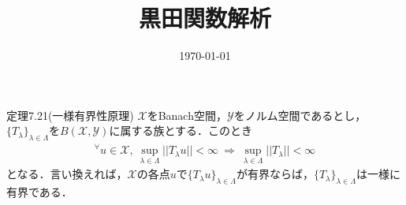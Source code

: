\documentclass[dvipdfmx]{jsarticle}
\title{黒田関数解析}
\author{\empty}
\date{\today}
\begin{document}
%
\begin{itembox}[l]{定理7.21(一様有界性原理)}
$\mathcal{X}$をBanach空間，$\mathcal{Y}$をノルム空間であるとし，$\{T_\lambda\}_{\lambda\in\Lambda}$を$B(\mathcal{X},\mathcal{Y})$に属する族とする．このとき
\begin{align*}
^\forall u\in\mathcal{X},{\ }\sup_{\lambda\in\Lambda}{||T_\lambda u||}<\infty {\ }\Longrightarrow{\ } \sup_{\lambda\in\Lambda}{||T_\lambda||}<\infty
\end{align*}
となる．言い換えれば，$\mathcal{X}$の各点$u$で$\{T_\lambda u\}_{\lambda\in\Lambda}$が有界ならば，$\{T_\lambda\}_{\lambda\in\Lambda}$は一様に有界である．
\end{itembox}
\vspace{-0.7zh}%
\vspace{-0.7zh}%
\vspace{-0.7zh}%
\end{document}
